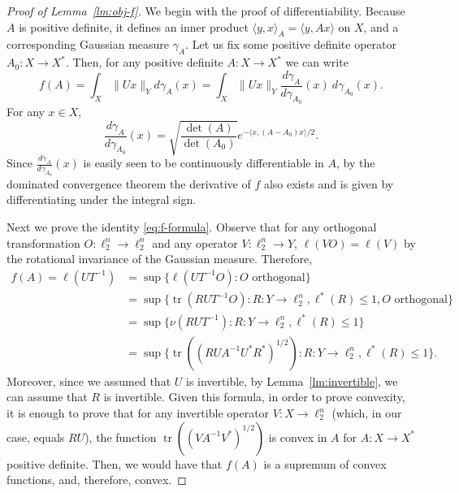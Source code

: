 \documentclass[11pt]{article}
\DeclareMathOperator{\tr}{tr}
\begin{document}
\begin{proof}[Proof of Lemma~\ref{lm:obj-f}]
  We begin with the proof of differentiability. Because $A$ is
  positive definite, it defines an inner product $\langle y,x\rangle_A
  = \langle y, Ax\rangle$ on $X$, and a corresponding Gaussian measure
  $\gamma_A$. Let us fix some positive definite operator $A_0:X \to
  X^*$. Then, for any positive definite $A: X \to X^*$ we can write
  \[
  f(A) = \int_X \|Ux\|_Y d\gamma_A(x)
  = \int_X \|Ux\|_Y \frac{d\gamma_{A}}{d\gamma_{A_0}}(x)\ d\gamma_{A_0}(x).
  \]
  For any $x \in X$, 
  \[
  \frac{d\gamma_{A}}{d\gamma_{A_0}}(x) =
  \sqrt{\frac{\det(A)}{\det(A_0)}} e^{-\langle x, (A - A_0)x\rangle / 2}.
  \]
  Since $\frac{d\gamma_{A}}{d\gamma_{A_0}}(x)$ is easily seen to be
  continuously differentiable in $A$, by the dominated convergence
  theorem the derivative of $f$ also exists and is given by
  differentiating under the integral sign.

  Next we prove the identity \eqref{eq:f-formula}. Observe that for
  any orthogonal transformation $O:\ell_2^n \to \ell_2^n$ and any
  operator $V: \ell_2^n \to Y$, $\ell(VO) = \ell(V)$ by the
  rotational invariance of the Gaussian measure. Therefore,
  \begin{align*}
  f(A) = \ell(UT^{-1}) &= \sup\{\ell(UT^{-1}O): O \text{ orthogonal}\}\\
  &= \sup\{\tr(RUT^{-1}O): R:Y\to\ell_2^n, \ell^*(R) \le 1, O \text{ orthogonal}\}\\
  &= \sup\{\nu(RUT^{-1}): R:Y\to\ell_2^n, \ell^*(R) \le 1\}\\
  &= \sup\{\tr((RUA^{-1}U^*R^*)^{1/2}): R:Y\to\ell_2^n, \ell^*(R) \le  1\}. 
  \end{align*}
  Moreover, since we assumed that $U$ is invertible, by
  Lemma~\ref{lm:invertible}, we can assume that $R$ is invertible.
  Given this formula, in order to prove convexity, it is enough to
  prove that for any invertible operator $V:X \to \ell^n_2$ (which, in
  our case, equals $RU$), the function $\tr((VA^{-1}V^*)^{1/2})$ is
  convex in $A$ for $A:X\to X^*$ positive definite. Then, we would
  have that $f(A)$ is a supremum of convex functions, and, therefore,
  convex.  


\end{proof}
\end{document}
